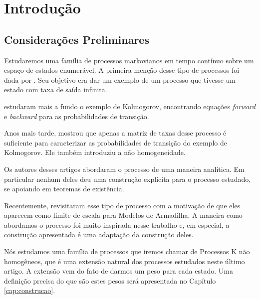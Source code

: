 \chapter{Introdução}
\label{cap:introducao}

\section{Considerações Preliminares}
\label{sec:consideracoes_preliminares}

Estudaremos uma família de processos markovianos em tempo contínuo
sobre um espaço de estados enumerável. A primeira menção desse tipo de
processos foi dada por \cite{kolmogorov:51}. Seu objetivo era dar um
exemplo de um processo que tivesse um estado com taxa de saída
infinita.

\cite{kendall:56} estudaram mais a fundo o exemplo de Kolmogorov,
encontrando equações \emph{forward} e \emph{backward} para as
probabilidades de transição.

Anos mais tarde, \cite{reuter:69} mostrou que apenas a matriz de taxas
desse processo é suficiente para caracterizar as probabilidades de
transição do exemplo de Kolmogorov. Ele também introduziu a não
homogeneidade.

Os autores desses artigos abordaram o processo de uma maneira
analítica. Em particular nenhum deles deu uma construção explícita
para o processo estudado, se apoiando em teoremas de existência.

Recentemente, \cite{fontes:08} revisitaram esse tipo de processo com a
motivação de que eles aparecem como limite de escala para Modelos de
Armadilha. A maneira como abordamos o processo foi muito inspirada
nesse trabalho e, em especial, a construção apresentada é uma
adaptação da construção deles.


Nós estudamos uma família de processos que iremos chamar de Processos
K não homogêneos, que é uma extensão natural dos processos estudados
neste último artigo. A extensão vem do fato de darmos um peso para
cada estado. Uma definição precisa do que são estes pesos será
apresentada no Capítulo \ref{cap:construcao}.

